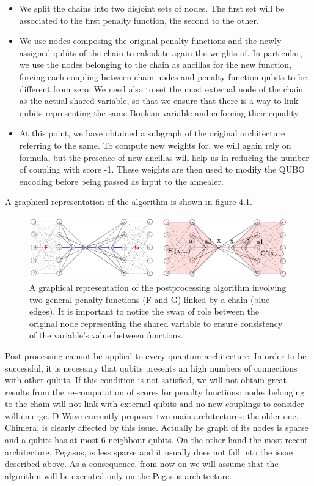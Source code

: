 \begin{itemize}
    \item We split the chains into two disjoint sets of nodes. The first set will be associated to the first penalty function, the second to the other.
    \item We use nodes composing the original penalty functions and the newly assigned qubits of the chain to calculate again the weights of. In particular, we use the nodes belonging to the chain as ancillas for the new function, forcing each coupling between chain nodes and penalty function qubits to be different from zero. We need also to set the most external node of the chain as the actual shared variable, so that we ensure that there is a way to link qubits representing the same Boolean variable and enforcing their equality.
    \item At this point, we have obtained a subgraph of the original architecture referring to the same. To compute new weights for, we will again rely on formula, but the presence of new ancillas will help us in reducing the number of coupling with score -1. These weights are then used to modify the QUBO encoding before being passed as input to the annealer.
\end{itemize}

A graphical representation of the algorithm is shown in figure 4.1.

\begin{figure}[t]
	\begin{center}
	\includegraphics[width=\textwidth]{PostAlg.png}
	\caption{A graphical representation of the postprocessing algorithm involving two general penalty functions (F and G) linked by a chain (blue edges). It is important to notice the swap of role between the original node representing the shared variable to ensure consistency of the variable's value between functions.}
	\end{center}
\end{figure}

Post-processing cannot be applied to every quantum architecture. In order to be successful, it is necessary that qubits presents an high numbers of connections with other qubits. If this condition is not satisfied, we will not obtain great results from the re-computation of scores for penalty functions: nodes belonging to the chain will not link with external qubits and no new couplings to consider will emerge. D-Wave currently proposes two main architectures: the older one, Chimera, is clearly affected by this issue. Actually he graph of its nodes is sparse and a qubits has at most 6 neighbour qubits. On the other hand the most recent architecture, Pegasus, is less sparse and it usually does not fall into the issue described above. As a consequence, from now on we will assume that the algorithm will be executed only on the Pegasus architecture.


